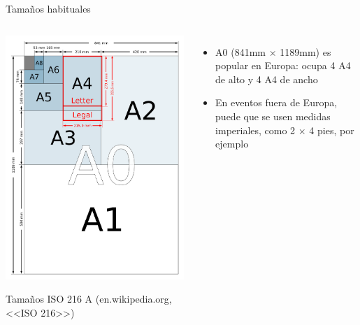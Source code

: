 \documentclass[xcolor=svgnames,compress]{beamer}
\begin{document}
\begin{frame}{Tamaños habituales}
  \begin{columns}

    \begin{center}
      \includegraphics[width=\textwidth,height=.7\textheight,keepaspectratio]{A_size_illustration2_with_letter_and_legal}

      Tamaños ISO 216 A (en.wikipedia.org, <<ISO 216>>)
    \end{center}

    \begin{itemize}
    \item A0 (841mm $\times$ 1189mm) es popular en Europa: ocupa 4 A4
      de alto y 4 A4 de ancho
    \item En eventos fuera de Europa, puede que se usen medidas
      imperiales, como 2 $\times$ 4 pies, por ejemplo
    \end{itemize}
  \end{columns}
\end{frame}
\end{document}
